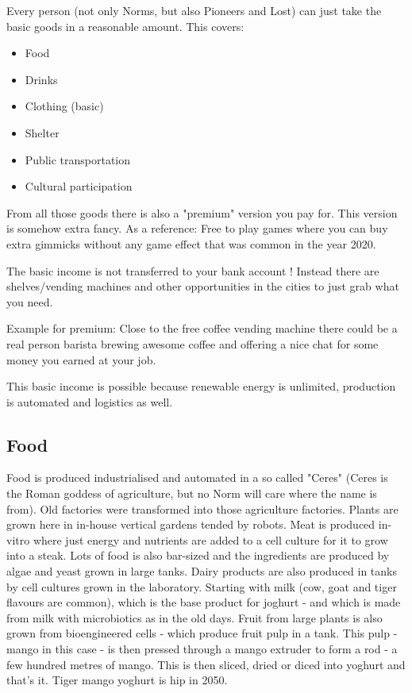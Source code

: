 Every person (not only Norms, but also Pioneers and Lost) can just take the basic goods in a reasonable amount. This covers:

\begin{itemize}
    \item Food
    \item Drinks
    \item Clothing (basic)
    \item Shelter
    \item Public transportation
    \item Cultural participation
\end{itemize}

From all those goods there is also a "premium" version you pay for. This version is somehow extra fancy. As a reference: Free to play games where you can buy extra gimmicks without any game effect that was common in the year 2020.

The basic income is not transferred to your bank account ! Instead there are shelves/vending machines and other opportunities in the cities to just grab what you need.

Example for premium: Close to the free coffee vending machine there could be a real person barista brewing awesome coffee and offering a nice chat for some money you earned at your job.

This basic income is possible because renewable energy is unlimited, production is automated and logistics as well.

\subsection{Food}
\label{sec: norm food}

Food is produced industrialised and automated in a so called "Ceres" (Ceres is the Roman goddess of agriculture, but no Norm will care where the name is from). Old factories were transformed into those agriculture factories. Plants are grown here in in-house vertical gardens tended by robots.
Meat is produced in-vitro where just energy and nutrients are added to a cell culture for it to grow into a steak. Lots of food is also bar-sized and the ingredients are produced by algae and yeast grown in large tanks.
Dairy products are also produced in tanks by cell cultures grown in the laboratory. Starting with milk (cow, goat and tiger flavours are common), which is the base product for joghurt - and which is made from milk with microbiotics as in the old days.
Fruit from large plants is also grown from bioengineered cells - which produce fruit pulp in a tank. This pulp - mango in this case - is then pressed through a mango extruder to form a rod - a few hundred metres of mango. This is then sliced, dried or diced into yoghurt and that's it. Tiger mango yoghurt is hip in 2050.

